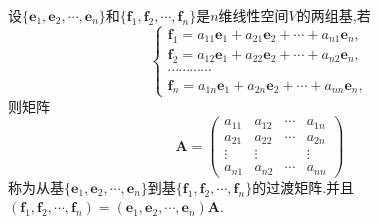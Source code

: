 \documentclass[lang=cn,newtx,10pt,scheme=chinese]{elegantbook}
\begin{document}
\begin{definition}[过渡矩阵]\label{definition:过渡矩阵}
设\(\{\boldsymbol{e}_1,\boldsymbol{e}_2,\cdots,\boldsymbol{e}_n\}\)和\(\{\boldsymbol{f}_1,\boldsymbol{f}_2,\cdots,\boldsymbol{f}_n\}\)是\(n\)维线性空间\(V\)的两组基,若
\[
\begin{cases}
\boldsymbol{f}_1 = a_{11}\boldsymbol{e}_1 + a_{21}\boldsymbol{e}_2+\cdots + a_{n1}\boldsymbol{e}_n,\\
\boldsymbol{f}_2 = a_{12}\boldsymbol{e}_1 + a_{22}\boldsymbol{e}_2+\cdots + a_{n2}\boldsymbol{e}_n,\\
\cdots\cdots\cdots\cdots\\
\boldsymbol{f}_n = a_{1n}\boldsymbol{e}_1 + a_{2n}\boldsymbol{e}_2+\cdots + a_{nn}\boldsymbol{e}_n,
\end{cases}
\]
则矩阵
\[
\boldsymbol{A}=\begin{pmatrix}
a_{11}&a_{12}&\cdots&a_{1n}\\
a_{21}&a_{22}&\cdots&a_{2n}\\
\vdots&\vdots&&\vdots\\
a_{n1}&a_{n2}&\cdots&a_{nn}
\end{pmatrix}
\]
称为从基\(\{\boldsymbol{e}_1,\boldsymbol{e}_2,\cdots,\boldsymbol{e}_n\}\)到基\(\{\boldsymbol{f}_1,\boldsymbol{f}_2,\cdots,\boldsymbol{f}_n\}\)的过渡矩阵.并且$\left( \boldsymbol{f}_1,\boldsymbol{f}_2,\cdots ,\boldsymbol{f}_n \right) =\left( \boldsymbol{e}_1,\boldsymbol{e}_2,\cdots ,\boldsymbol{e}_n \right) \boldsymbol{A}$.
\end{definition}
\end{document}
